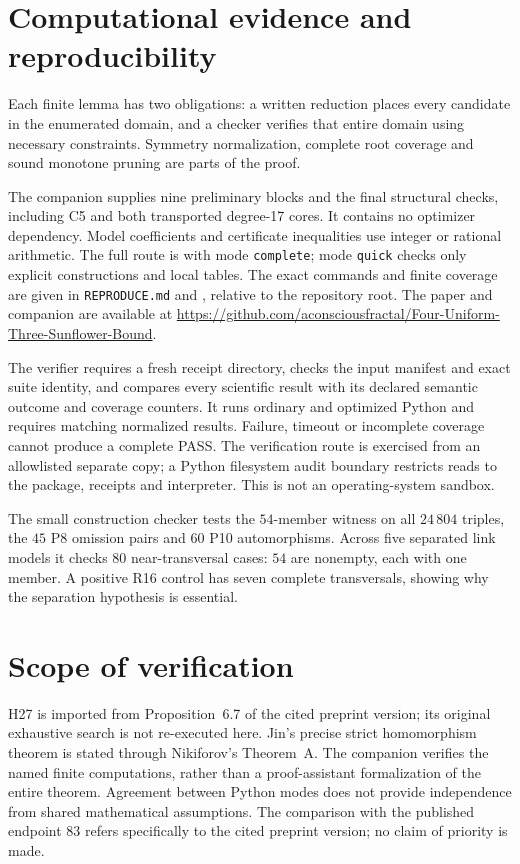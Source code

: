 \documentclass[11pt,a4paper]{article}
\numberwithin{equation}{section}
\theoremstyle{remark}
\begin{document}
\section{Computational evidence and reproducibility}
\label{sec:reproduction}
Each finite lemma has two obligations: a written reduction places every
candidate in the enumerated domain, and a checker verifies that entire
domain using necessary constraints. Symmetry normalization, complete
root coverage and sound monotone pruning are parts of the proof.

The companion supplies nine preliminary blocks and the final structural
checks, including C5 and both transported degree-17 cores. It contains
no optimizer dependency. Model coefficients and certificate inequalities
use integer or rational arithmetic. The full route is
 with mode \texttt{complete}; mode
\texttt{quick} checks only explicit constructions and local tables.
The exact commands and finite coverage are given in \texttt{REPRODUCE.md}
and , relative to the repository root.
The paper and companion are available at
\url{https://github.com/aconsciousfractal/Four-Uniform-Three-Sunflower-Bound}.

The verifier requires a fresh receipt directory, checks the input manifest
and exact suite identity, and compares every scientific result with its
declared semantic outcome and coverage counters. It runs ordinary and
optimized Python and requires matching normalized results. Failure,
timeout or incomplete coverage cannot produce a complete PASS.
The verification route is exercised from an allowlisted separate copy;
a Python filesystem audit boundary restricts reads to the package,
receipts and interpreter. This is not an operating-system sandbox.

The small construction checker tests the $54$-member witness on all
$24\,804$ triples, the $45$ P8 omission pairs and $60$ P10 automorphisms.
Across five separated link models it checks $80$ near-transversal cases:
$54$ are nonempty, each with one member. A positive R16 control has seven
complete transversals, showing why the separation hypothesis is essential.

\section{Scope of verification}
H27 is imported from Proposition~6.7 of the cited preprint version;
its original exhaustive search is not re-executed here. Jin's precise
strict homomorphism theorem is stated through Nikiforov's Theorem~A.
The companion verifies the named finite computations, rather than a
proof-assistant formalization of the entire theorem. Agreement between
Python modes does not provide independence from shared mathematical
assumptions. The comparison with the published endpoint $83$ refers
specifically to the cited preprint version; no claim of priority is made.
\end{document}
